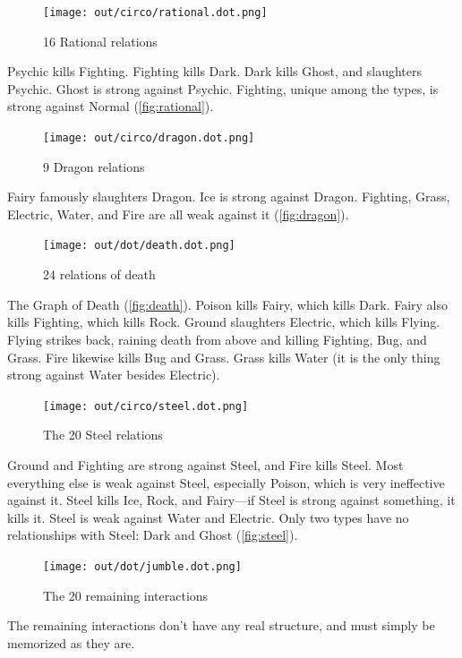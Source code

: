 \begin{figure}[ht]
\centering
\texttt{[image: out/circo/rational.dot.png]}
\caption{16 Rational relations}
\label{fig:rational}
\end{figure}
\noindent{}Psychic kills Fighting.
Fighting kills Dark.
Dark kills Ghost, and slaughters Psychic.
Ghost is strong against Psychic.
Fighting, unique among the types, is strong against Normal (\autoref{fig:rational}).
\clearpage

\begin{figure}[t!]
\centering
\texttt{[image: out/circo/dragon.dot.png]}
\caption{9 Dragon relations}
\label{fig:dragon}
\end{figure}
\noindent{}Fairy famously slaughters Dragon.
Ice is strong against Dragon.
Fighting, Grass, Electric, Water, and Fire are all weak against it (\autoref{fig:dragon}).
\vspace{.5in}

\begin{figure}[h!]
\centering
\texttt{[image: out/dot/death.dot.png]}
\caption{24 relations of death}
\label{fig:death}
\end{figure}
\noindent{}The Graph of Death (\autoref{fig:death}).
Poison kills Fairy, which kills Dark.
Fairy also kills Fighting, which kills Rock.
Ground slaughters Electric, which kills Flying.
Flying strikes back, raining death from above and killing Fighting, Bug, and Grass.
Fire likewise kills Bug and Grass.
Grass kills Water (it is the only thing strong against Water besides Electric).
\clearpage

\begin{figure}[h!]
\centering
\texttt{[image: out/circo/steel.dot.png]}
\caption{The 20 Steel relations}
\label{fig:steel}
\end{figure}
\noindent{}Ground and Fighting are strong against Steel, and Fire kills Steel.
Most everything else is weak against Steel, especially
 Poison, which is very ineffective against it.
Steel kills Ice, Rock, and Fairy---if Steel is strong against something, it kills it.
Steel is weak against Water and Electric.
Only two types have no relationships with Steel: Dark and Ghost (\autoref{fig:steel}).

\begin{figure}[ht]
\centering
\texttt{[image: out/dot/jumble.dot.png]}
\caption{The 20 remaining interactions}
\end{figure}
The remaining interactions don't have any real structure, and must simply be
memorized as they are.

